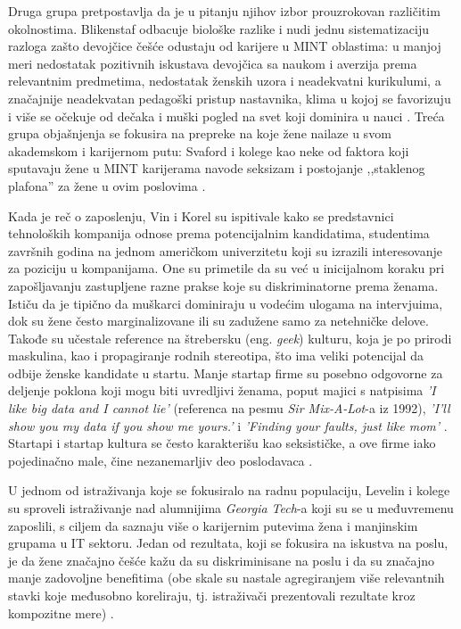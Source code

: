 Druga grupa pretpostavlja da je u pitanju njihov izbor prouzrokovan različitim okolnostima\cite{hellens, blickenstaff}. Blikenstaf odbacuje biološke razlike i nudi jednu sistematizaciju razloga zašto devojčice češće odustaju od karijere u MINT oblastima: u manjoj meri nedostatak pozitivnih iskustava devojčica sa naukom i averzija prema relevantnim predmetima, nedostatak ženskih uzora i neadekvatni kurikulumi, a značajnije neadekvatan pedagoški pristup nastavnika, klima u kojoj se favorizuju i više se očekuje od dečaka i muški pogled na svet koji dominira u nauci \cite{blickenstaff}. Treća grupa objašnjenja se fokusira na prepreke na koje žene nailaze u svom akademskom i karijernom putu: Svaford i kolege kao neke od faktora koji sputavaju žene u MINT karijerama navode seksizam i postojanje ,,staklenog plafona'' za žene u ovim poslovima \cite{swafford}.

Kada je reč o zaposlenju, Vin i Korel su ispitivale kako se predstavnici tehnoloških kompanija odnose prema potencijalnim kandidatima, studentima završnih godina na jednom američkom univerzitetu koji su izrazili interesovanje za poziciju u kompanijama. One su primetile da su već u inicijalnom koraku pri zapošljavanju zastupljene razne prakse koje su diskriminatorne prema ženama. Ističu da je tipično da muškarci dominiraju u vodećim ulogama na intervjuima, dok su žene često marginalizovane ili su zadužene samo za netehničke delove. Takođe su učestale reference na štrebersku (eng. \emph{geek}) kulturu, koja je po prirodi maskulina, kao i propagiranje rodnih stereotipa, što ima veliki potencijal da odbije ženske kandidate u startu. Manje startap firme su posebno odgovorne za deljenje poklona koji mogu biti uvredljivi ženama, poput majici s natpisima \emph{'I like big data and I cannot lie'} (referenca na pesmu \emph{Sir Mix-A-Lot}-a iz 1992), \emph{'I’ll show you my data if you show me yours.'} i \emph{'Finding your faults, just like mom'} \cite{wynn}. Startapi i startap kultura se često karakterišu kao seksističke, a ove firme iako pojedinačno male, čine nezanemarljiv deo poslodavaca \cite{steinberg-forbes}.

U jednom od istraživanja koje se fokusiralo na radnu populaciju, Levelin i kolege su sproveli istraživanje nad alumnijima \emph{Georgia Tech}-a koji su se u međuvremenu zaposlili, s ciljem da saznaju više o karijernim putevima žena i manjinskim grupama u IT sektoru. Jedan od rezultata, koji se fokusira na iskustva na poslu, je da žene značajno češće kažu da su diskriminisane na poslu i da su značajno manje zadovoljne benefitima (obe skale su nastale agregiranjem više relevantnih stavki koje međusobno koreliraju, tj. istraživači prezentovali rezultate kroz kompozitne mere) \cite{llewellyn}.

